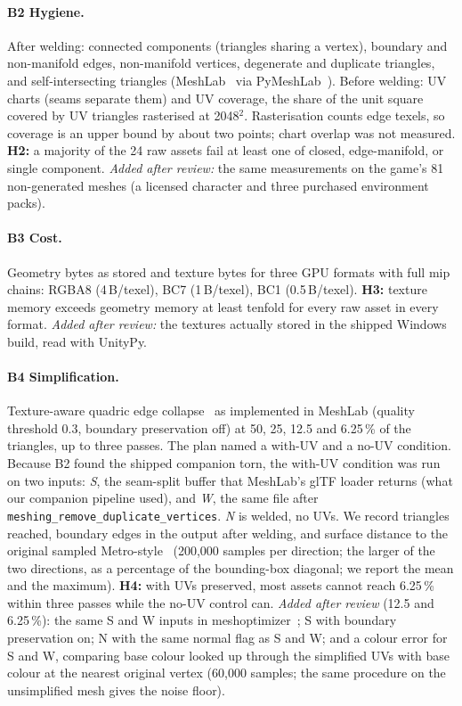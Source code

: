\paragraph{B2 Hygiene.} After welding: connected components (triangles sharing a
vertex), boundary and non-manifold edges, non-manifold vertices, degenerate and
duplicate triangles, and self-intersecting triangles (MeshLab~\cite{cignoni2008meshlab}
via PyMeshLab~\cite{muntoni2021pymeshlab}). Before welding: UV charts (seams
separate them) and UV coverage, the share of the unit square covered by UV
triangles rasterised at 2048$^2$. Rasterisation counts edge texels, so coverage
is an upper bound by about two points; chart overlap was not measured.
\textbf{H2:} a majority of the 24 raw assets fail at least one of closed,
edge-manifold, or single component. \emph{Added after review:} the same
measurements on the game's 81 non-generated meshes (a licensed character and three
purchased environment packs).

\paragraph{B3 Cost.} Geometry bytes as stored and texture bytes for three GPU
formats with full mip chains: RGBA8 (4\,B/texel), BC7 (1\,B/texel), BC1
(0.5\,B/texel). \textbf{H3:} texture memory exceeds geometry memory at least
tenfold for every raw asset in every format. \emph{Added after review:} the
textures actually stored in the shipped Windows build, read with UnityPy.

\paragraph{B4 Simplification.} Texture-aware quadric edge
collapse~\cite{garland1997qem,garland1998colorqem,hoppe1999newqem} as implemented
in MeshLab (quality threshold 0.3, boundary preservation off) at 50, 25, 12.5 and
6.25\,\% of the triangles, up to three passes. The plan named a with-UV and a
no-UV condition. Because B2 found the shipped companion torn, the with-UV
condition was run on two inputs: \emph{S}, the seam-split buffer that MeshLab's
glTF loader returns (what our companion pipeline used), and \emph{W}, the same
file after \texttt{meshing\_remove\_duplicate\_vertices}. \emph{N} is welded, no
UVs. We record triangles reached, boundary edges in the output after welding,
and surface distance to the original sampled Metro-style~\cite{cignoni1998metro}
(200,000 samples per direction; the larger of the two directions, as a percentage
of the bounding-box diagonal; we report the mean and the maximum).
\textbf{H4:} with UVs preserved, most assets cannot reach 6.25\,\% within three
passes while the no-UV control can. \emph{Added after review} (12.5 and
6.25\,\%): the same S and W inputs in meshoptimizer~\cite{meshopt}; S with
boundary preservation on; N with the same normal flag as S and W;
and a colour error for S and W, comparing base colour looked up through the
simplified UVs with base colour at the nearest original vertex (60,000 samples;
the same procedure on the unsimplified mesh gives the noise floor).

